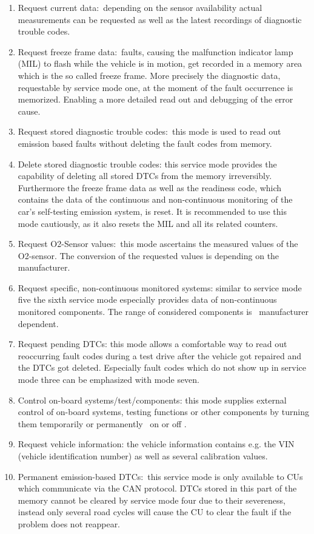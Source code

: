 \begin{enumerate}
\tightlist
\item
  {Request current data:}{~depending on the sensor availability actual
  measurements can be requested as well as the latest recordings of
  diagnostic trouble codes.}
\item
  {Request freeze frame data:}{~faults, causing the malfunction
  indicator lamp (MIL) to flash while the vehicle is in motion, get
  recorded in a memory area which is the so called freeze frame. More
  precisely the diagnostic data, requestable by service mode one, at the
  moment of the fault occurrence is memorized. Enabling }{a more
  detailed read out and debugging of the error cause.}
\item
  {Request stored diagnostic trouble codes:}{~this mode is used to read
  out emission based faults without deleting the fault codes from
  memory.}
\item
  {Delete stored diagnostic trouble codes: }{this service mode provides
  the capability of deleting all stored DTCs from the memory
  irreversibly. Furthermore the freeze frame data as well as the
  readiness code, which contains the data of the continuous and
  non-continuous monitoring of the car's self-testing emission system,
  is reset. It is recommended to use this mode cautiously, as it also
  resets the MIL and all its related counters.}
\item
  {Request O}{2}{-Sensor values:}{~this mode ascertains the measured
  values of the O}{2}{-sensor. The conversion of the requested values is
  depending on the manufacturer.}
\item
  {Request specific, non-continuous monitored systems: }{similar to
  service mode five the sixth service mode especially provides data of
  non-continuous monitored components. The range of considered
  components is ~manufacturer dependent.}
\item
  {Request pending DTCs: }{this mode allows a comfortable way to read
  out reoccurring fault codes during a test drive after the vehicle got
  repaired and the DTCs got deleted. Especially fault codes which do not
  show up in service mode three can be emphasized with mode seven.}
\item
  {Control on-board systems/test/components: }{this mode supplies
  external control of on-board systems, testing functions or other
  components by turning them temporarily or permanently ~on or off .}
\item
  {Request vehicle information}{: the vehicle information contains e.g.
  the VIN (vehicle identification number) as well as several calibration
  values.}
\item
  {Permanent emission-based DTCs:}{~this service mode is }{only
  available to CUs which communicate via the CAN protocol. DTCs stored
  in this part of the memory cannot be cleared by service mode four due
  to their severeness, instead only several road cycles will cause the
  CU to clear the fault if the problem does not reappear.}
\end{enumerate}

